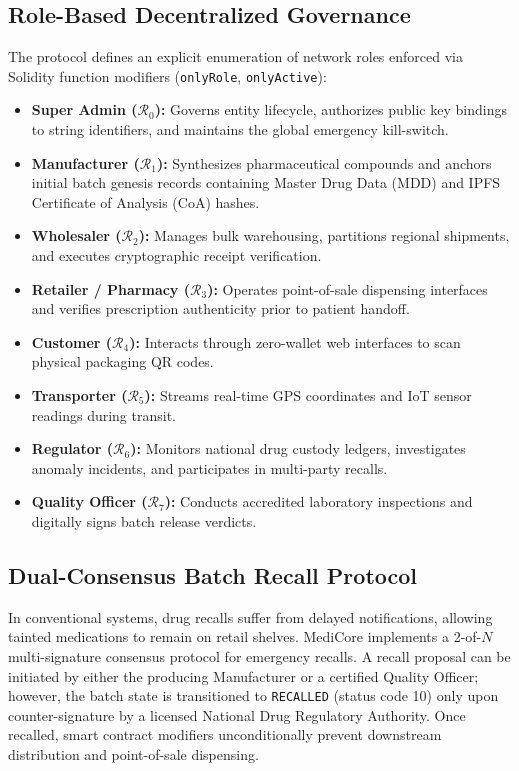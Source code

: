 \documentclass[11pt,a4paper]{article}
\begin{document}
\subsection{Role-Based Decentralized Governance}
The protocol defines an explicit enumeration of network roles enforced via Solidity function modifiers (\texttt{onlyRole}, \texttt{onlyActive}):
\begin{itemize}
    \item \textbf{Super Admin ($\mathcal{R}_0$):} Governs entity lifecycle, authorizes public key bindings to string identifiers, and maintains the global emergency kill-switch.
    \item \textbf{Manufacturer ($\mathcal{R}_1$):} Synthesizes pharmaceutical compounds and anchors initial batch genesis records containing Master Drug Data (MDD) and IPFS Certificate of Analysis (CoA) hashes.
    \item \textbf{Wholesaler ($\mathcal{R}_2$):} Manages bulk warehousing, partitions regional shipments, and executes cryptographic receipt verification.
    \item \textbf{Retailer / Pharmacy ($\mathcal{R}_3$):} Operates point-of-sale dispensing interfaces and verifies prescription authenticity prior to patient handoff.
    \item \textbf{Customer ($\mathcal{R}_4$):} Interacts through zero-wallet web interfaces to scan physical packaging QR codes.
    \item \textbf{Transporter ($\mathcal{R}_5$):} Streams real-time GPS coordinates and IoT sensor readings during transit.
    \item \textbf{Regulator ($\mathcal{R}_6$):} Monitors national drug custody ledgers, investigates anomaly incidents, and participates in multi-party recalls.
    \item \textbf{Quality Officer ($\mathcal{R}_7$):} Conducts accredited laboratory inspections and digitally signs batch release verdicts.
\end{itemize}

\subsection{Dual-Consensus Batch Recall Protocol}
In conventional systems, drug recalls suffer from delayed notifications, allowing tainted medications to remain on retail shelves. MediCore implements a 2-of-$N$ multi-signature consensus protocol for emergency recalls. A recall proposal can be initiated by either the producing Manufacturer or a certified Quality Officer; however, the batch state is transitioned to \texttt{RECALLED} (status code 10) only upon counter-signature by a licensed National Drug Regulatory Authority. Once recalled, smart contract modifiers unconditionally prevent downstream distribution and point-of-sale dispensing.
\end{document}
